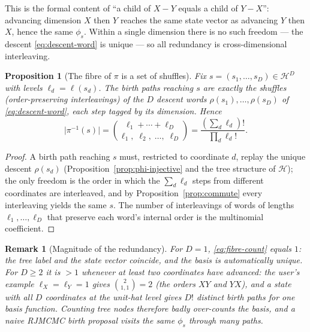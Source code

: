 \documentclass[11pt]{article}
\newtheorem{proposition}{Proposition}
\newtheorem{remark}{Remark}
\begin{document}
This is the formal content of ``a child of $X\!-\!Y$ equals a child of
$Y\!-\!X$'': advancing dimension $X$ then $Y$ reaches the same state vector as
advancing $Y$ then $X$, hence the same $\phi_s$.  Within a single dimension
there is no such freedom --- the descent \eqref{eq:descent-word} is unique --- so
all redundancy is cross-dimensional interleaving.

\begin{proposition}[The fibre of $\pi$ is a set of shuffles]
\label{prop:fibre}
Fix $s=(s_1,\dots,s_D)\in\mathcal{H}^D$ with levels $\ell_d=\ell(s_d)$.  The
birth paths reaching $s$ are exactly the \emph{shuffles} (order-preserving
interleavings) of the $D$ descent words $\rho(s_1),\dots,\rho(s_D)$ of
\eqref{eq:descent-word}, each step tagged by its dimension.  Hence
\begin{equation}
  \bigl|\pi^{-1}(s)\bigr|
  = \binom{\ell_1+\cdots+\ell_D}{\ell_1,\;\ell_2,\;\dots,\;\ell_D}
  = \frac{(\sum_d \ell_d)!}{\prod_d \ell_d!}.
  \label{eq:fibre-count}
\end{equation}
\end{proposition}
\begin{proof}
A birth path reaching $s$ must, restricted to coordinate $d$, replay the unique
descent $\rho(s_d)$ (Proposition~\ref{prop:phi-injective} and the tree structure
of $\mathcal{H}$); the only freedom is the order in which the $\sum_d\ell_d$
steps from different coordinates are interleaved, and by
Proposition~\ref{prop:commute} every interleaving yields the same $s$.  The
number of interleavings of words of lengths $\ell_1,\dots,\ell_D$ that preserve
each word's internal order is the multinomial coefficient.
\end{proof}

\begin{remark}[Magnitude of the redundancy]
For $D=1$, \eqref{eq:fibre-count} equals $1$: the tree label and the state
vector coincide, and the basis is automatically unique.  For $D\ge2$ it is
$>1$ whenever at least two coordinates have advanced: the user's example
$\ell_X=\ell_Y=1$ gives $\binom{2}{1,1}=2$ (the orders $XY$ and $YX$), and a
state with all $D$ coordinates at the unit-hat level gives $D!$ distinct birth
paths for one basis function.  Counting tree nodes therefore badly
over-counts the basis, and a naive RJMCMC birth proposal visits the same
$\phi_s$ through many paths.
\end{remark}
\end{document}
